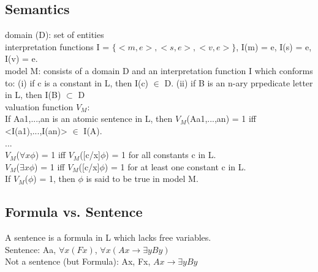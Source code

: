 \subsection*{Semantics}
domain (D): set of entities \\
interpretation functions I = $\{<m,e>, <s,e>, <v,e> \}$, I(m) = e, I(s) = e, I(v) = e. \\
model M: consists of a domain D and an interpretation function I which conforms to:
{\tiny (i) if c is a constant in L, then I(c) $\in$ D. (ii) if B is an n-ary prpedicate letter in L, then I(B) $\subset$ D\\}
valuation function $V_M$: \\
{\tiny If Aa1,...,an is an atomic sentence in L, then $V_M$(Aa1,...,an) = 1 iff <I(a1),...,I(an)> $\in$ I(A). \\
... \\
$V_M$($\forall x \phi$) = 1 iff $V_M$([c/x]$\phi$) = 1 for all constants c in L. \\
$V_M$($\exists x \phi$) = 1 iff $V_M$([c/x]$\phi$) = 1 for at least one constant c in L. \\
If $V_M$($\phi$) = 1, then $\phi$ is said to be true in model M.}
\subsection*{Formula vs. Sentence}
A sentence is a formula in L which lacks free variables. \\
Sentence: Aa, $\forall x (Fx)$, $\forall x (Ax \to \exists y By)$ \\
Not a sentence (but Formula): Ax, Fx, $Ax \to \exists y By$